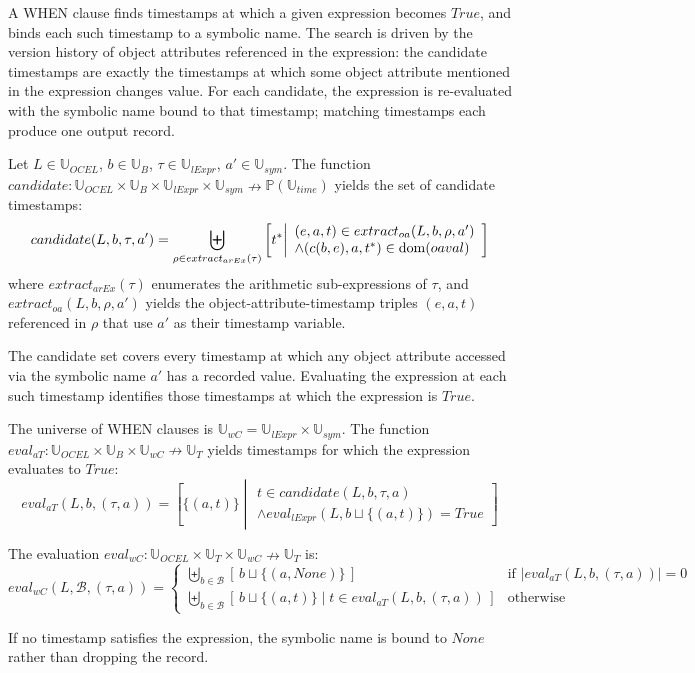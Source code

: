 A WHEN clause finds timestamps at which a given expression becomes $True$, and binds each such timestamp to a symbolic name. The search is driven by the version history of object attributes referenced in the expression: the candidate timestamps are exactly the timestamps at which some object attribute mentioned in the expression changes value. For each candidate, the expression is re-evaluated with the symbolic name bound to that timestamp; matching timestamps each produce one output record.

\begin{frameddef}
Let $L \in \mathbb{U}_{OCEL}$, $b \in \mathbb{U}_B$, $\tau \in \mathbb{U}_{lExpr}$, $a' \in \mathbb{U}_{sym}$. The function $candidate : \mathbb{U}_{OCEL} \times \mathbb{U}_B \times \mathbb{U}_{lExpr} \times \mathbb{U}_{sym} \nrightarrow \mathbb{P}(\mathbb{U}_{time})$ yields the set of candidate timestamps:
\[
candidate(L, b, \tau, a') = \biguplus_{\rho \in extract_{arEx}(\tau)} \left[ t^* \middle\vert \begin{array}{l} (e, a, t) \in extract_{oa}(L, b, \rho, a') \\ \land (c(b, e), a, t^*) \in \operatorname*{dom}(oaval) \end{array} \right]
\]
where $extract_{arEx}(\tau)$ enumerates the arithmetic sub-expressions of $\tau$, and $extract_{oa}(L, b, \rho, a')$ yields the object-attribute-timestamp triples $(e, a, t)$ referenced in $\rho$ that use $a'$ as their timestamp variable.
\end{frameddef}

The candidate set covers every timestamp at which any object attribute accessed via the symbolic name $a'$ has a recorded value. Evaluating the expression at each such timestamp identifies those timestamps at which the expression is $True$.

\begin{frameddef}
The universe of WHEN clauses is $\mathbb{U}_{wC} = \mathbb{U}_{lExpr} \times \mathbb{U}_{sym}$. The function $eval_{aT} : \mathbb{U}_{OCEL} \times \mathbb{U}_B \times \mathbb{U}_{wC} \nrightarrow \mathbb{U}_T$ yields timestamps for which the expression evaluates to $True$:
\[
eval_{aT}(L, b, (\tau, a)) = \left[ \{(a, t)\} \middle\vert \begin{array}{l} t \in candidate(L, b, \tau, a) \\ \land eval_{lExpr}(L, b \sqcup \{(a, t)\}) = True \end{array} \right]
\]

The evaluation $eval_{wC} : \mathbb{U}_{OCEL} \times \mathbb{U}_T \times \mathbb{U}_{wC} \nrightarrow \mathbb{U}_T$ is:
\[
eval_{wC}(L, \mathcal{B}, (\tau, a)) = \begin{cases}
\biguplus_{b \in \mathcal{B}} [\, b \sqcup \{(a, None)\} \,] & \text{if } |eval_{aT}(L, b, (\tau, a))| = 0 \\
\biguplus_{b \in \mathcal{B}} [\, b \sqcup \{(a, t)\} \mid t \in eval_{aT}(L, b, (\tau, a)) \,] & \text{otherwise}
\end{cases}
\]

If no timestamp satisfies the expression, the symbolic name is bound to $None$ rather than dropping the record.
\end{frameddef}

